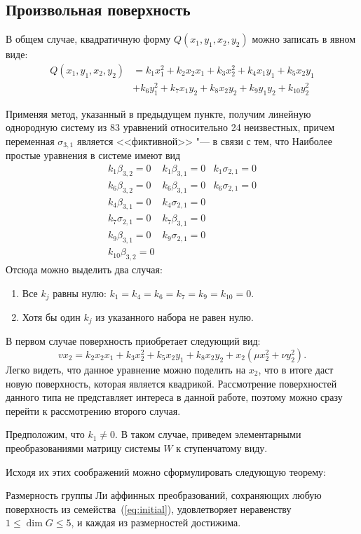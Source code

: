 \documentclass[../main.tex]{subfiles}
\begin{document}
\subsection{Произвольная поверхность}
В общем случае, квадратичную форму $Q(x_1, y_1, x_2, y_2)$ можно записать в явном виде:
\begin{align*}
Q(x_1, y_1, x_2, y_2) &= k_1 x_1^2 + k_2 x_2 x_1 + k_3 x_2^2 + k_4 x_1 y_1 + k_5 x_2 y_1 \\
&+ k_6 y_1^2 + k_7 x_1 y_2 + k_8 x_2 y_2 + k_9 y_1 y_2 + k_{10} y_2^2
\end{align*}

Применяя метод, указанный в предыдущем пункте, получим линейную однородную систему из 83 уравнений относительно 24 неизвестных, причем переменная $\sigma_{3,1}$ является <<фиктивной>> "--- в связи с тем, что   Наиболее простые уравнения в системе имеют вид
\begin{equation}
\begin{matrix}
 k_1 \beta _{3,2}=0 &  k_1 \beta _{3,1}=0 &  k_1 \sigma _{2,1}=0 \\
 k_6 \beta _{3,2}=0 & k_6 \beta _{3,1}=0 & k_6 \sigma _{2,1}=0 \\
 k_4 \beta _{3,1}=0 &  k_4 \sigma _{2,1}=0 \\
 k_7 \sigma _{2,1}=0 & k_7 \beta _{3,1}=0 \\
 k_9 \beta _{3,1}=0 & k_9 \sigma _{2,1}=0 \\
 k_{10} \beta _{3,2}=0
\end{matrix}
\end{equation}
Отсюда можно выделить два случая:
\begin{enumerate}
	\item Все $k_j$ равны нулю: $k_1 = k_4 = k_6 = k_7 = k_9 = k_{10} = 0$.
	\item Хотя бы один $k_j$ из указанного набора не равен нулю.
\end{enumerate}
В первом случае поверхность приобретает следующий вид:
\begin{equation*}
v x_2 = k_2 x_2 x_1 + k_3 x_2^2 + k_5 x_2 y_1 + k_8 x_2 y_2 + x_2 (\mu x_2^2 + \nu y_2^2).
\end{equation*}
Легко видеть, что данное уравнение можно поделить на $x_2$, что в итоге даст новую поверхность, которая является квадрикой. Рассмотрение поверхностей данного типа не представляет интереса в данной работе, поэтому можно сразу перейти к рассмотрению второго случая.

Предположим, что $k_1 \ne 0 $. В таком случае, приведем элементарными преобразованиями матрицу системы $W$ к ступенчатому виду.

Исходя их этих соображений можно сформулировать следующую теорему:

\begin{theorem} Размерность группы Ли аффинных преобразований, сохраняющих любую поверхность из семейства~(\ref{eq:initial}), удовлетворяет неравенству $1 \le \dim G \le 5$, и каждая из размерностей достижима.
\end{theorem}
\end{document}
